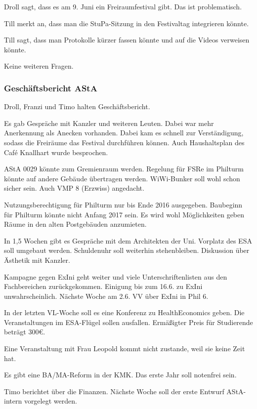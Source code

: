 \documentclass[ngerman,headheight=70pt]{scrartcl}
\begin{document}
    Droll sagt, dass es am 9. Juni ein Freiraumfestival gibt. Das ist
    problematisch.

    Till merkt an, dass man die StuPa-Sitzung in den Festivaltag
    integrieren könnte.

    Till sagt, dass man Protokolle kürzer fassen könnte und auf die Videos
    verweisen könnte.

    Keine weiteren Fragen.

    \subsubsection{Geschäftsbericht AStA}

    Droll, Franzi und Timo halten Geschäftsbericht.

    Es gab Gespräche mit Kanzler und weiteren Leuten. Dabei war mehr
    Anerkennung als Anecken vorhanden. Dabei kam es schnell zur Verständigung,
    sodass die Freiräume das Festival durchführen können.
    Auch Haushaltsplan des Café Knallhart wurde besprochen.

    AStA 0029 könnte zum Gremienraum werden. Regelung für FSRe im Philturm
    könnte auf andere Gebäude übertragen werden. WiWi-Bunker soll wohl
    schon sicher sein. Auch VMP 8 (Erzwiss) angedacht.

    Nutzungsberechtigung für Philturm nur bis Ende 2016 ausgegeben.
    Baubeginn für Philturm könnte nicht Anfang 2017 sein. Es wird wohl
    Möglichkeiten geben Räume in den alten Postgebäuden anzumieten.

    In 1,5 Wochen gibt es Gespräche mit dem Architekten der Uni.
    Vorplatz des ESA soll umgebaut werden. Schuldenuhr soll weiterhin
    stehenbleiben. Diskussion über Ästhetik mit Kanzler.

    Kampagne gegen ExIni geht weiter und viele Unterschriftenlisten aus
    den Fachbereichen zurückgekommen. Einigung bis zum 16.6. zu ExIni
    unwahrscheinlich. Nächste Woche am 2.6. VV über ExIni in Phil 6.

    In der letzten VL-Woche soll es eine Konferenz zu HealthEconomics geben.
    Die Veranstaltungen im ESA-Flügel sollen ausfallen. Ermäßigter Preis
    für Studierende beträgt 300€.

    Eine Veranstaltung mit Frau Leopold kommt nicht zustande, weil sie
    keine Zeit hat.

    Es gibt eine BA/MA-Reform in der KMK. Das erste Jahr soll notenfrei
    sein.

    Timo berichtet über die Finanzen. Nächste Woche soll der erste Entwurf
    AStA-intern vorgelegt werden.
\end{document}
